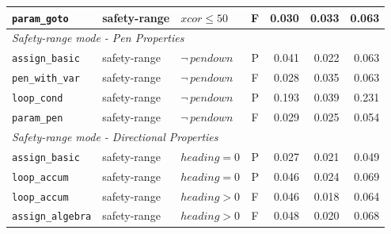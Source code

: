 \begin{longtable}{p{} p{} p{} c r r r}
\texttt{param\_goto}     & safety-range & $\mathit{xcor}\leq 50$       & F & 0.030 & 0.033 & 0.063 \\
\midrule
\multicolumn{7}{l}{\textit{Safety-range mode - Pen Properties}} \\
\midrule
\texttt{assign\_basic}   & safety-range & $\neg\,\mathit{pendown}$     & P & 0.041 & 0.022 & 0.063 \\
\texttt{pen\_with\_var}  & safety-range & $\neg\,\mathit{pendown}$     & F & 0.028 & 0.035 & 0.063 \\
\texttt{loop\_cond}      & safety-range & $\neg\,\mathit{pendown}$     & P & 0.193 & 0.039 & 0.231 \\
\texttt{param\_pen}      & safety-range & $\neg\,\mathit{pendown}$     & F & 0.029 & 0.025 & 0.054 \\
\midrule
\multicolumn{7}{l}{\textit{Safety-range mode - Directional Properties}} \\
\midrule
\texttt{assign\_basic}   & safety-range & $\mathit{heading}=0$         & P & 0.027 & 0.021 & 0.049 \\
\texttt{loop\_accum}     & safety-range & $\mathit{heading}=0$         & P & 0.046 & 0.024 & 0.069 \\
\texttt{loop\_accum}     & safety-range & $\mathit{heading}>0$         & F & 0.046 & 0.018 & 0.064 \\
\texttt{assign\_algebra} & safety-range & $\mathit{heading}>0$         & F & 0.048 & 0.020 & 0.068 \\
\end{longtable}

